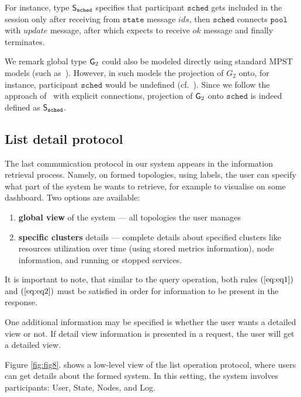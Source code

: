 For instance, type ${\mathsf S}_\mathtt{sched}$ specifies that participant $\mathtt{sched}$ gets included in the session only after receiving from $\mathtt{state}$ message $\mathit{ids}$, then $\mathtt{sched}$ connects $\mathtt{pool}$ with $\mathit{update}$ message, after which expects to receive $\mathit{ok}$ message and finally terminates. 

We remark global type ${\sf G}_2$ could also be modeled directly using standard MPST models (such as~\cite{HondaYC08}). However, in such models the projection of $G_2$ onto, for instance, participant $\mathtt{sched}$ would be undefined (cf.~\cite{HuY17}).
Since we follow the approach of~\cite{HuY17} with explicit connections, projection of ${\sf G}_2$ onto $\mathtt{sched}$ is indeed defined as ${\mathsf S}_\mathtt{sched}$.
%
%
\subsection{List detail protocol}\label{sec:list_detail_protocol}
%
The last communication protocol in our system appears in the information retrieval process. Namely, on formed topologies, using labels, the user can specify what part of the system he wants to retrieve, for example to visualise on some dashboard. Two options are available: 

\begin{enumerate}[start=1,label={(\bfseries \arabic*)}]
	\item \textbf{global view} of the system --- all topologies the user manages
	\item \textbf{specific clusters} details --- complete details about specified clusters like resources utilization over time (using stored metrics information), node information, and running or stopped services.
\end{enumerate}
 
It is important to note, that similar to the query operation, both rules $(\ref{eq:eq1})$ and $(\ref{eq:eq2})$ must be satisfied in order for information to be present in the response. 

One additional information may be specified is whether the user wants a detailed view or not. If detail view information is presented in a request, the user will get a detailed view. 

Figure \ref{fig:fig8}. shows a low-level view of the list operation protocol, where users can get details about the formed system. In this setting, the system involves participants: User, State, Nodes, and Log. 

